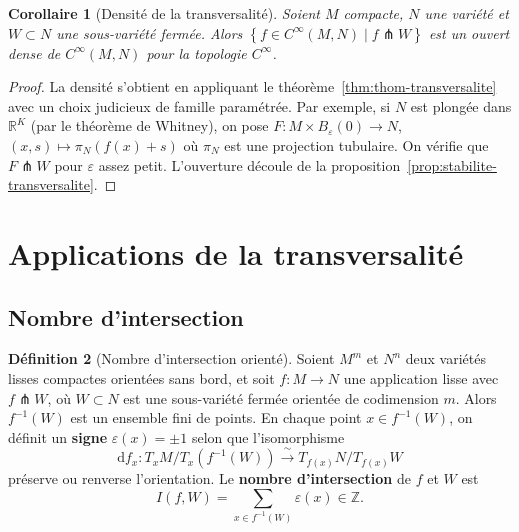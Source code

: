 \documentclass[12pt,a4paper,openany]{book}
\theoremstyle{definition}
\newtheorem{definition}{Définition}[chapter]
\theoremstyle{plain}
\newtheorem{corollaire}[definition]{Corollaire}
\theoremstyle{remark}
\newcommand{\Z}{\mathbb{Z}}
\newcommand{\R}{\mathbb{R}}
\newcommand{\dd}{\mathrm{d}}
\newcommand{\set}[1]{\left\{#1\right\}}
\begin{document}
\begin{corollaire}[Densité de la transversalité]\label{cor:densite-transversalite}%
Soient $M$ compacte, $N$ une variété et $W \subset N$ une sous-variété
fermée. Alors $\set{f \in C^\infty(M, N) \mid f \pitchfork W}$ est un
ouvert dense de $C^\infty(M, N)$ pour la topologie $C^\infty$.
\end{corollaire}

\begin{proof}
La densité s'obtient en appliquant le théorème~\ref{thm:thom-transversalite}
avec un choix judicieux de famille paramétrée. Par exemple, si $N$ est
plongée dans $\R^K$ (par le théorème de Whitney), on pose
$F \colon M \times B_\varepsilon(0) \to N$, $(x, s) \mapsto \pi_N(f(x) + s)$
où $\pi_N$ est une projection tubulaire. On vérifie que $F \pitchfork W$
pour $\varepsilon$ assez petit. L'ouverture découle de la
proposition~\ref{prop:stabilite-transversalite}.
\end{proof}

\section{Applications de la transversalité}\label{sec:applications-transversalite}

\subsection{Nombre d'intersection}\label{subsec:nombre-intersection}

\begin{definition}[Nombre d'intersection orienté]%
\label{def:nombre-intersection}
Soient $M^m$ et $N^n$ deux variétés lisses compactes orientées sans bord,
et soit $f \colon M \to N$ une application lisse avec $f \pitchfork W$,
où $W \subset N$ est une sous-variété fermée orientée de codimension $m$.
Alors $f^{-1}(W)$ est un ensemble fini de points. En chaque point
$x \in f^{-1}(W)$, on définit un \textbf{signe}
$\varepsilon(x) = \pm 1$ selon que l'isomorphisme
\[
  \dd f_x \colon T_x M / T_x(f^{-1}(W)) \xrightarrow{\;\sim\;} T_{f(x)} N / T_{f(x)} W
\]
préserve ou renverse l'orientation. Le \textbf{nombre d'intersection} de
$f$ et $W$ est
\[
  I(f, W) = \sum_{x \in f^{-1}(W)} \varepsilon(x) \in \Z.
\]
\end{definition}
\end{document}
